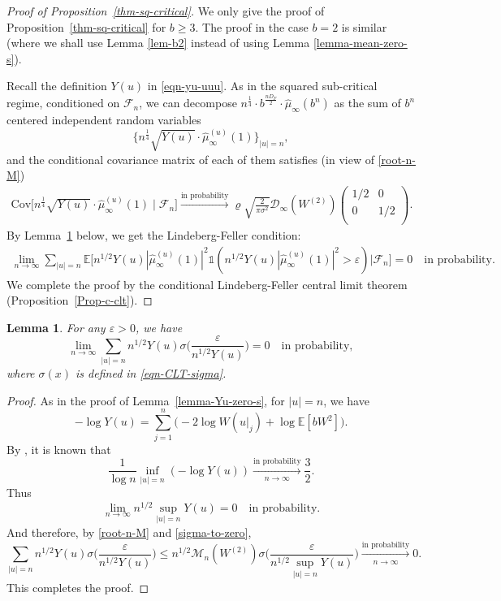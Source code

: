 \documentclass[12pt]{amsart}
\newtheorem{lemma}[theorem]{Lemma}
\theoremstyle{definition}
\theoremstyle{remark}
\newcommand{\E}{\mathbb{E}}
\newcommand{\MAB}{\mathscr{M}_{n}(W^{(2)})}
\newcommand{\VU}{Y(u)}
\numberwithin{equation}{section}
\begin{document}
\begin{proof}[Proof of Proposition~\ref{thm-sq-critical}]
We only give the proof of Proposition~\ref{thm-sq-critical} for $b \ge 3$. The proof in the case $b =2$ is similar (where we shall use Lemma \ref{lem-b2} instead of using Lemma \ref{lemma-mean-zero-s}). 

 Recall the definition $\VU$ in  \eqref{eqn-yu-uuu}.
As in  the squared sub-critical regime,   conditioned on $\mathscr{F}_n$,  we  can decompose  $n^{\frac{1}{4}} \cdot b^{\frac{n D_F}{2}}  \cdot \widehat{\mu}_{\infty}(b^n)$ as the sum of $b^{n}$ centered independent random variables 
\[
\big\{n^{\frac{1}{4}}\sqrt{\VU}  \cdot \widehat{\mu}_{\infty}^{(u)}(1)\big\}_{|u|=n}, 
\]
and the conditional covariance matrix of each of them  satisfies  (in view of \eqref{root-n-M}) 
\begin{align*}
\mathrm{Cov}\big[n^{\frac{1}{4}}\sqrt{\VU}  \cdot \widehat{\mu}_{\infty}^{(u)}(1) \mid \mathscr{F}_{n}\big] 
\xrightarrow{\textrm{in probability}}   \varrho \sqrt{\frac{2}{ \pi\sigma^2}} \mathscr{D}_\infty(W^{(2)})   \begin{pmatrix}
1/2 &0\\
0&1/2\\
\end{pmatrix}.
\end{align*}
By Lemma~\ref{lemma-CLT-critical} below,  we get the   Lindeberg-Feller condition:
 \begin{align*}
\lim_{n\rightarrow \infty} \sum_{|u|=n} \E\Big[n^{1/2}\VU |\widehat{\mu}_{\infty}^{(u)}(1)|^2\mathds{1}(n^{1/2}\VU |\widehat{\mu}_{\infty}^{(u)}(1)|^2>\varepsilon)\Big|\mathscr{F}_n\Big]=0 \quad \text{in probability}.
 \end{align*}
We complete the proof by the conditional Lindeberg-Feller central limit theorem  (Proposition~\ref{Prop-c-clt}).
\end{proof}
\begin{lemma}\label{lemma-CLT-critical}
For any $\varepsilon> 0$, we have 
\[
\lim_{n\rightarrow\infty} \sum_{|u|=n} n^{1/2}\VU\sigma\Big(\frac{\varepsilon}{n^{1/2}\VU}\Big)=0 \quad \text{in probability},
\]
where $\sigma(x)$ is defined in \eqref{eqn-CLT-sigma}. 
\end{lemma}
\begin{proof}
As in  the proof of Lemma~\ref{lemma-Yu-zero-s}, for $|u|=n$, we have
\[
- \log \VU= \sum_{j=1}^n \big  (-2 \log W(u|_j) + \log \E[bW^2]\big). 
\]
By \cite[Theorem 5.12]{shi-zhan-book}, it is known that 
\[
\frac{1}{\log n} \inf_{|u|=n} ( - \log \VU) \xrightarrow[n\rightarrow\infty]{\text{in probability}}\frac{3}{2}.
\]
Thus 
\[
\lim_{n\rightarrow\infty} n^{1/2}\sup_{|u|=n} \VU= 0 \quad \text{in probability}.
\]
And therefore, by \eqref{root-n-M} and  \eqref{sigma-to-zero}, 
\[
\sum_{|u|=n} n^{1/2}\VU\sigma\Big(\frac{\varepsilon}{n^{1/2}\VU}\Big)\leq   n^{1/2}\MAB\sigma\Big(\frac{\varepsilon}{n^{1/2}\sup_{|u|=n}\VU}\Big)\xrightarrow[n\rightarrow\infty]{\text{in probability}} 0.
\]
This completes the proof. 
\end{proof}
\end{document}
